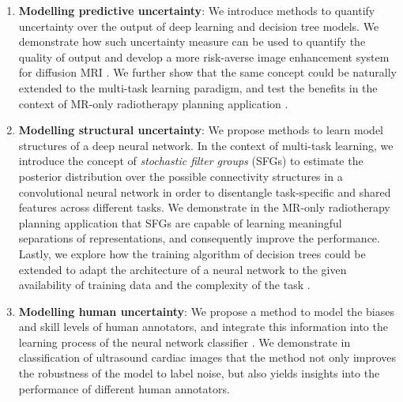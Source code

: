 \begin{enumerate}
	\item \textbf{Modelling predictive uncertainty}:  We introduce methods to quantify uncertainty over the output of deep learning and decision tree models. We demonstrate how such uncertainty measure can be used to quantify the quality of output and develop a more risk-averse image enhancement system for diffusion MRI \cite{tanno2016bayesian,tanno2017bayesian,tannonimg2019}.  We further show that the same concept could be naturally extended to the multi-task learning paradigm, and test the benefits in the context of MR-only radiotherapy planning application \cite{bragman2018multi}. 
	
	\item \textbf{Modelling structural uncertainty}: We propose methods to learn model structures of a deep neural network. In the context of multi-task learning, we introduce the concept of \emph{stochastic filter  groups} (SFGs) \cite{sfg2019} to estimate the posterior distribution over the possible connectivity structures in a convolutional neural network in order to disentangle task-specific and shared features across different tasks. We demonstrate in the MR-only radiotherapy planning application that SFGs are capable of learning meaningful separations of representations, and consequently improve the performance. Lastly, we explore how the training algorithm of decision trees could be extended to adapt the architecture of a neural network to the given availability of training data and the complexity of the task \cite{AdaptiveNeuralTrees19}. 
	
	\item \textbf{Modelling human uncertainty}: We propose a method to model the biases and skill levels of human annotators, and integrate this information into the learning process of the neural network classifier \cite{tanno2019learning}. We demonstrate in classification of ultrasound cardiac images that the method not only improves the robustness of the model to label noise, but also yields insights into the performance of different human annotators.
	
\end{enumerate}

